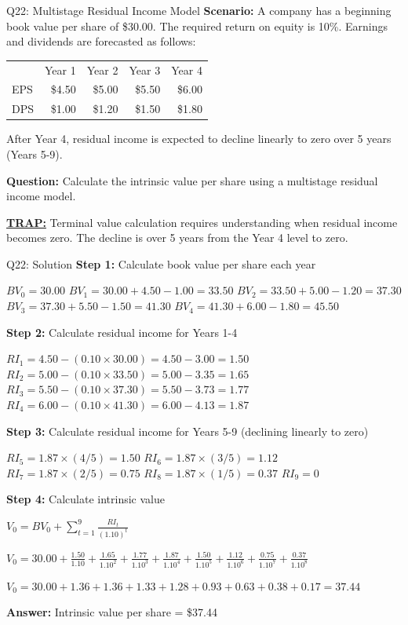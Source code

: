 \documentclass{beamer}
\renewcommand{\scriptsize}{\fontsize{6pt}{7pt}\selectfont}
\begin{document}
	\begin{frame}{Q22: Multistage Residual Income Model}
		\scriptsize
		\textbf{Scenario:} A company has a beginning book value per share of \$30.00. The required return on equity is 10\%. Earnings and dividends are forecasted as follows:
		
		\begin{tabular}{lrrrr}
			& Year 1 & Year 2 & Year 3 & Year 4 \\
			EPS & \$4.50 & \$5.00 & \$5.50 & \$6.00 \\
			DPS & \$1.00 & \$1.20 & \$1.50 & \$1.80 \\
		\end{tabular}
		
		After Year 4, residual income is expected to decline linearly to zero over 5 years (Years 5-9).
		
		\textbf{Question:} Calculate the intrinsic value per share using a multistage residual income model.
		
		\vspace{2pt}
		\underline{\textbf{TRAP:}} Terminal value calculation requires understanding when residual income becomes zero. The decline is over 5 years from the Year 4 level to zero.
	\end{frame}
	
	\begin{frame}{Q22: Solution}
		\scriptsize
		\textbf{Step 1:} Calculate book value per share each year
		
		$BV_0 = 30.00$
		$BV_1 = 30.00 + 4.50 - 1.00 = 33.50$
		$BV_2 = 33.50 + 5.00 - 1.20 = 37.30$
		$BV_3 = 37.30 + 5.50 - 1.50 = 41.30$
		$BV_4 = 41.30 + 6.00 - 1.80 = 45.50$
		
		\vspace{2pt}
		\textbf{Step 2:} Calculate residual income for Years 1-4
		
		$RI_1 = 4.50 - (0.10 \times 30.00) = 4.50 - 3.00 = 1.50$
		$RI_2 = 5.00 - (0.10 \times 33.50) = 5.00 - 3.35 = 1.65$
		$RI_3 = 5.50 - (0.10 \times 37.30) = 5.50 - 3.73 = 1.77$
		$RI_4 = 6.00 - (0.10 \times 41.30) = 6.00 - 4.13 = 1.87$
		
		\vspace{2pt}
		\textbf{Step 3:} Calculate residual income for Years 5-9 (declining linearly to zero)
		
		$RI_5 = 1.87 \times (4/5) = 1.50$
		$RI_6 = 1.87 \times (3/5) = 1.12$
		$RI_7 = 1.87 \times (2/5) = 0.75$
		$RI_8 = 1.87 \times (1/5) = 0.37$
		$RI_9 = 0$
		
		\vspace{2pt}
		\textbf{Step 4:} Calculate intrinsic value
		
		$V_0 = BV_0 + \sum_{t=1}^{9} \frac{RI_t}{(1.10)^t}$
		
		$V_0 = 30.00 + \frac{1.50}{1.10} + \frac{1.65}{1.10^2} + \frac{1.77}{1.10^3} + \frac{1.87}{1.10^4} + \frac{1.50}{1.10^5} + \frac{1.12}{1.10^6} + \frac{0.75}{1.10^7} + \frac{0.37}{1.10^8}$
		
		$V_0 = 30.00 + 1.36 + 1.36 + 1.33 + 1.28 + 0.93 + 0.63 + 0.38 + 0.17 = 37.44$
		
		\textbf{Answer:} Intrinsic value per share = \$37.44
	\end{frame}
	
\end{document}
